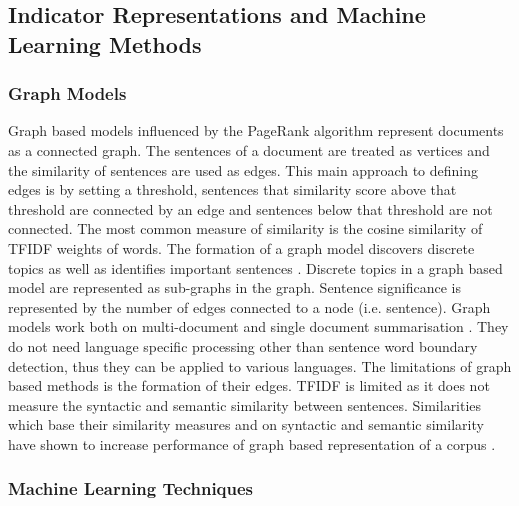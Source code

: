 \subsection{Indicator Representations and Machine Learning Methods}
\label{subsec:2.3.2}

\subsubsection{Graph Models}
Graph based models influenced by the PageRank algorithm \citep{berkhin2005survey} represent documents as a connected graph. The sentences of a document are treated as vertices and the similarity of sentences are used as edges. This main approach to defining edges is by setting a threshold, sentences that similarity score above that threshold are connected by an edge and sentences below that threshold are not connected. The most common measure of similarity is the cosine similarity of TFIDF weights of words. The formation of a graph model discovers discrete topics as well as identifies important sentences \citep{allahyari2017text}. Discrete topics in a graph based model are represented as sub-graphs in the graph. Sentence significance is represented by the number of edges connected to a node (i.e. sentence). Graph models work both on multi-document and single document summarisation \citep{erkan2004lexrank}. They do not need language specific processing other than sentence word boundary detection, thus they can be applied to various languages. The limitations of graph based methods is the formation of their edges. TFIDF is limited as it does not measure the syntactic and semantic similarity between sentences. Similarities which base their similarity measures and on syntactic and semantic similarity have shown to increase performance of graph based representation of a corpus \citep{chali2008improving}.

\subsubsection{Machine Learning Techniques}

